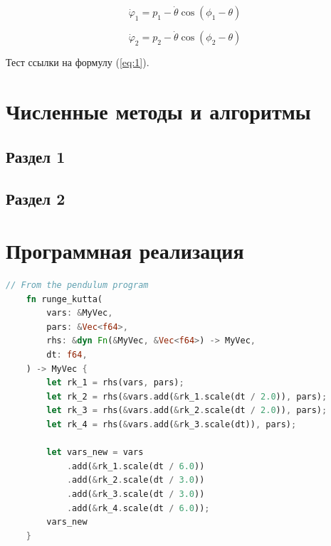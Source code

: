 \documentclass[a4paper,14pt]{extarticle}
\begin{document}
\begin{equation}
    \dot{\varphi}_{1}=p_{1}-\dot{\theta}\cos(\phi_{1}-\theta)
\end{equation}

\begin{equation}
    \dot{\varphi}_{2}=p_{2}-\dot{\theta}\cos(\phi_{2}-\theta)
\end{equation}

Тест ссылки на формулу (\ref{eq:1}).

\pagebreak
\section{Численные методы и алгоритмы}

\subsection{Раздел 1}

\subsection{Раздел 2}

\pagebreak
\section{Программная реализация}

\begin{lstlisting}[language=rust,caption={Программная реализация метода Рунге-Кутты},label={listing-1}]
    // From the pendulum program
    fn runge_kutta(
        vars: &MyVec,
        pars: &Vec<f64>,
        rhs: &dyn Fn(&MyVec, &Vec<f64>) -> MyVec,
        dt: f64,
    ) -> MyVec {
        let rk_1 = rhs(vars, pars);
        let rk_2 = rhs(&vars.add(&rk_1.scale(dt / 2.0)), pars);
        let rk_3 = rhs(&vars.add(&rk_2.scale(dt / 2.0)), pars);
        let rk_4 = rhs(&vars.add(&rk_3.scale(dt)), pars);
    
        let vars_new = vars
            .add(&rk_1.scale(dt / 6.0))
            .add(&rk_2.scale(dt / 3.0))
            .add(&rk_3.scale(dt / 3.0))
            .add(&rk_4.scale(dt / 6.0));
        vars_new
    }
    \end{lstlisting}
    
\end{document}
